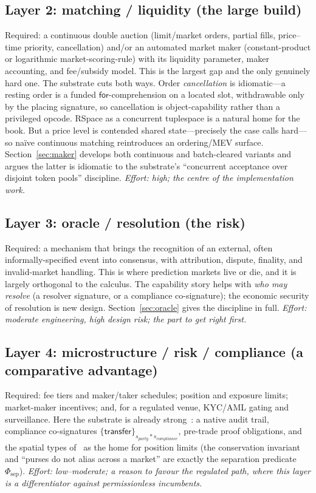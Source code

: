 \documentclass[11pt]{article}
\newcommand{\sep}{\mathbin{\ast}}
\begin{document}
\subsection*{Layer 2: matching / liquidity (the large build)}
Required: a continuous double auction (limit/market orders, partial fills, price--time
priority, cancellation) and/or an automated market maker (constant-product or logarithmic
market-scoring-rule) with its liquidity parameter, maker accounting, and fee/subsidy model.
This is the largest gap and the only genuinely hard one. The substrate cuts both ways. Order
\emph{cancellation} is idiomatic---a resting order is a funded $\mathsf{for}$-comprehension on
a located slot, withdrawable only by the placing signature, so cancellation is
object-capability rather than a privileged opcode. RSpace as a concurrent tuplespace is a
natural home for the book. But a price level is contended shared state---precisely the case
\cite[\S7]{finrho} calls hard---so na\"ive continuous matching reintroduces an ordering/MEV
surface. Section~\ref{sec:maker} develops both continuous and batch-cleared variants and
argues the latter is idiomatic to the substrate's ``concurrent acceptance over disjoint token
pools'' discipline. \emph{Effort: high; the centre of the implementation work.}

\subsection*{Layer 3: oracle / resolution (the risk)}
Required: a mechanism that brings the recognition of an external, often informally-specified
event into consensus, with attribution, dispute, finality, and invalid-market handling. This
is where prediction markets live or die, and it is largely orthogonal to the calculus. The
capability story helps with \emph{who may resolve} (a resolver signature, or a compliance
co-signature); the economic security of resolution is new design. Section~\ref{sec:oracle}
gives the discipline in full. \emph{Effort: moderate engineering, high design risk; the part
to get right first.}

\subsection*{Layer 4: microstructure / risk / compliance (a comparative advantage)}
Required: fee tiers and maker/taker schedules; position and exposure limits; market-maker
incentives; and, for a regulated venue, KYC/AML gating and surveillance. Here the substrate is
already strong~\cite[\S6]{finrho}: a native audit trail, compliance co-signatures
$\{\mathsf{transfer}\}_{s_{\mathit{party}}\sep s_{\mathit{compliance}}}$, pre-trade proof
obligations, and the spatial types of~\cite[\S8]{finrho} as the home for position limits (the
conservation invariant and ``purses do not alias across a market'' are exactly the separation
predicate $\Phi_{\mathrm{sep}}$). \emph{Effort: low--moderate; a reason to favour the
regulated path, where this layer is a differentiator against permissionless incumbents.}
\end{document}
